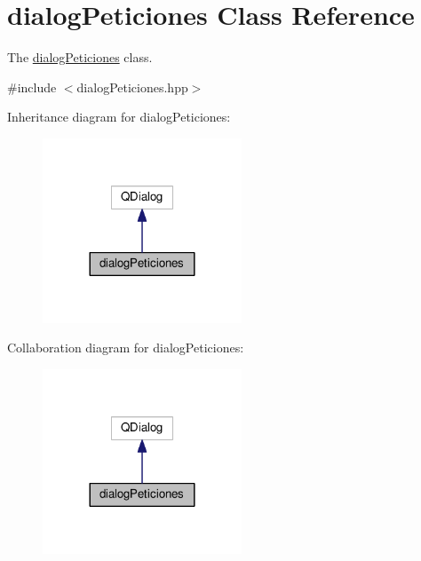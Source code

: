 \hypertarget{classdialogPeticiones}{}\section{dialog\+Peticiones Class Reference}
\label{classdialogPeticiones}


The \hyperlink{classdialogPeticiones}{dialog\+Peticiones} class.  




{\ttfamily \#include $<$dialog\+Peticiones.\+hpp$>$}



Inheritance diagram for dialog\+Peticiones\+:
\nopagebreak
\begin{figure}[H]
\begin{center}
\leavevmode
\includegraphics[width=168pt]{classdialogPeticiones__inherit__graph}
\end{center}
\end{figure}


Collaboration diagram for dialog\+Peticiones\+:
\nopagebreak
\begin{figure}[H]
\begin{center}
\leavevmode
\includegraphics[width=168pt]{classdialogPeticiones__coll__graph}
\end{center}
\end{figure}
